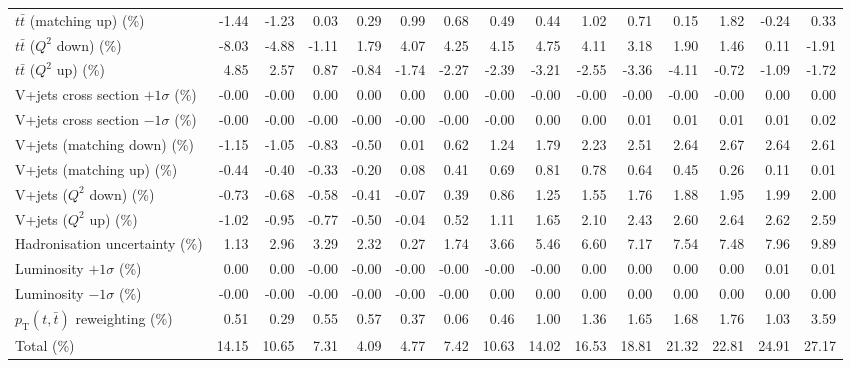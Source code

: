 \begin{table}[htbp]
{\begin{tabular}{lrrrrrrrrrrrrrr}
$t\bar{t}$ (matching up) (\%) & -1.44 & -1.23 & 0.03 & 0.29 & 0.99 & 0.68 & 0.49 & 0.44 & 1.02 & 0.71 & 0.15 & 1.82 & -0.24 & 0.33 \\ 
$t\bar{t}$ ($Q^{2}$ down) (\%) & -8.03 & -4.88 & -1.11 & 1.79 & 4.07 & 4.25 & 4.15 & 4.75 & 4.11 & 3.18 & 1.90 & 1.46 & 0.11 & -1.91 \\ 
$t\bar{t}$ ($Q^{2}$ up) (\%) & 4.85 & 2.57 & 0.87 & -0.84 & -1.74 & -2.27 & -2.39 & -3.21 & -2.55 & -3.36 & -4.11 & -0.72 & -1.09 & -1.72 \\ 
V+jets cross section \ensuremath{+1\sigma} (\%) & -0.00 & -0.00 & 0.00 & 0.00 & 0.00 & 0.00 & -0.00 & -0.00 & -0.00 & -0.00 & -0.00 & -0.00 & 0.00 & 0.00 \\ 
V+jets cross section \ensuremath{-1\sigma} (\%) & -0.00 & -0.00 & -0.00 & -0.00 & -0.00 & -0.00 & -0.00 & 0.00 & 0.00 & 0.01 & 0.01 & 0.01 & 0.01 & 0.02 \\ 
V+jets (matching down) (\%) & -1.15 & -1.05 & -0.83 & -0.50 & 0.01 & 0.62 & 1.24 & 1.79 & 2.23 & 2.51 & 2.64 & 2.67 & 2.64 & 2.61 \\ 
V+jets (matching up) (\%) & -0.44 & -0.40 & -0.33 & -0.20 & 0.08 & 0.41 & 0.69 & 0.81 & 0.78 & 0.64 & 0.45 & 0.26 & 0.11 & 0.01 \\ 
V+jets ($Q^{2}$ down) (\%) & -0.73 & -0.68 & -0.58 & -0.41 & -0.07 & 0.39 & 0.86 & 1.25 & 1.55 & 1.76 & 1.88 & 1.95 & 1.99 & 2.00 \\ 
V+jets ($Q^{2}$ up) (\%) & -1.02 & -0.95 & -0.77 & -0.50 & -0.04 & 0.52 & 1.11 & 1.65 & 2.10 & 2.43 & 2.60 & 2.64 & 2.62 & 2.59 \\ 
Hadronisation uncertainty (\%) & 1.13 & 2.96 & 3.29 & 2.32 & 0.27 & 1.74 & 3.66 & 5.46 & 6.60 & 7.17 & 7.54 & 7.48 & 7.96 & 9.89 \\ 
Luminosity $+1\sigma$ (\%) & 0.00 & 0.00 & -0.00 & -0.00 & -0.00 & -0.00 & -0.00 & -0.00 & 0.00 & 0.00 & 0.00 & 0.00 & 0.01 & 0.01 \\ 
Luminosity $-1\sigma$ (\%) & -0.00 & -0.00 & -0.00 & -0.00 & -0.00 & -0.00 & 0.00 & 0.00 & 0.00 & 0.00 & 0.00 & 0.00 & 0.00 & 0.00 \\ 
$p_\mathrm{T}(t,\bar{t})$ reweighting (\%) & 0.51 & 0.29 & 0.55 & 0.57 & 0.37 & 0.06 & 0.46 & 1.00 & 1.36 & 1.65 & 1.68 & 1.76 & 1.03 & 3.59 \\ 
\hline 
Total (\%) & 14.15  & 10.65  & 7.31  & 4.09  & 4.77  & 7.42  & 10.63  & 14.02  & 16.53  & 18.81  & 21.32  & 22.81  & 24.91  & 27.17 \\ 
\hline 
\end{tabular}
}
\end{table}
